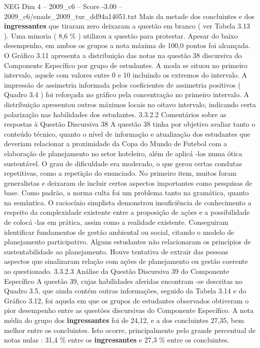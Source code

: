 \begin{textsample}{NEG Dim 4 – 2009\_c6 – Score -3.00 – 2009\_c6/enade\_2009\_tur\_dd94a14051.txt}
Mais da metade dos concluintes e dos \textbf{ingressantes} que tiraram zero deixaram a questão em branco ( ver Tabela 3.13 ).
Uma minoria ( 8,6 \% ) utilizou a questão para protestar.
Apesar do baixo desempenho, em ambos os grupos a nota máxima de 100,0 pontos foi alcançada.
O Gráfico 3.11 apresenta a distribuição das notas na questão 38 discursiva do Componente Específico por grupo de estudantes.
A moda se situou no primeiro intervalo, aquele com valores entre 0 e 10 incluindo os extremos do intervalo.
A impressão de assimetria informada pelos coeficientes de assimetria positivos ( Quadro 3.4 ) foi reforçada no gráfico pela concentração no primeiro intervalo.
A distribuição apresentou outros máximos locais no oitavo intervalo, indicando certa polarização nas habilidades dos estudantes. 3.3.2.2 Comentários sobre as respostas à Questão Discursiva 38 A questão 38 tinha por objetivo avaliar tanto o conteúdo técnico, quanto o nível de informação e atualização dos estudantes que deveriam relacionar a proximidade da Copa do Mundo de Futebol com a elaboração de planejamento no setor hoteleiro, além de aplicá -los numa ótica sustentável.
O grau de dificuldade era moderado, o que gerou certas condutas repetitivas, como a repetição do enunciado.
No primeiro item, muitos foram generalistas e deixaram de incluir certos aspectos importantes como pesquisas de base.
Como padrão, a norma culta foi um problema tanto na gramática, quanto na semântica.
O raciocínio simplista demonstrou insuficiência de conhecimento a respeito da complexidade existente entre a proposição de ações e a possibilidade de colocá -las em prática, assim como a realidade existente.
Conseguiram identificar fundamentos de gestão ambiental ou social, citando o modelo de planejamento participativo.
Alguns estudantes não relacionaram os princípios de sustentabilidade ao planejamento.
Houve tentativa de extrair das pessoas aspectos que sinalizaram relação com ações de planejamento ou gestão coerente ao questionado. 3.3.2.3 Análise da Questão Discursiva 39 do Componente Específico A questão 39, cujas habilidades aferidas encontram -se descritas no Quadro 3.5, que ainda contém outras informações, seguido da Tabela 3.14 e do Gráfico 3.12, foi aquela em que os grupos de estudantes observados obtiveram o pior desempenho entre as questões discursivas do Componente Específico.
A nota média do grupo dos \textbf{ingressantes} foi de 24,12, e a dos concluintes 27,35, bem melhor entre os concluintes.
Isto ocorre, principalmente pelo grande percentual de notas nulas : 31,4 \% entre os \textbf{ingressantes} e 27,3 \% entre os concluintes.

\end{textsample}
